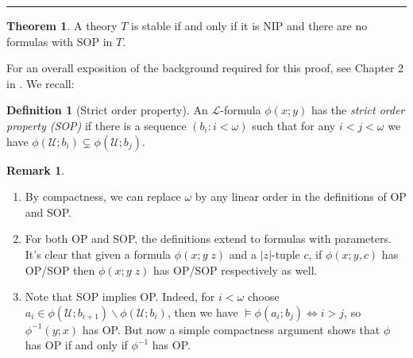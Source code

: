 \documentclass[a4paper]{report}
\newcommand{\ind}{\hspace{15pt}}
\newcommand{\tophat}{\hat{\phantom{.}}}
\renewcommand{\L}{\mathcal{L}}
\newcommand{\U}{\mathcal{U}}
\renewcommand{\iff}{\Leftrightarrow}
\theoremstyle{definition}
\newtheorem*{defn*}{Definition}
\newtheorem*{thm*}{Theorem}
\theoremstyle{remstyle}
\newtheorem*{rem*}{Remark}
\begin{document}
\par\noindent\rule{\textwidth}{0.4pt}

\begin{thm*}
	A theory $T$ is stable if and only if it is NIP and there are no formulas with SOP in $T$.
\end{thm*}

\ind For an overall exposition of the background required for this proof, see Chapter 2 in \cite{casanovas}. We recall:

\begin{defn*}[Strict order property]
	An $\L$-formula $\phi(x;y)$ has the \emph{strict order property (SOP)} if there is a sequence $(b_i:i<\omega)$ such that for any $i<j<\omega$ we have $\phi(\U;b_i)\subsetneq\phi(\U;b_j)$.
\end{defn*}

\begin{rem*}\
	\begin{enumerate}
		\item By compactness, we can replace $\omega$ by any linear order in the definitions of OP and SOP.
		\item For both OP and SOP, the definitions extend to formulas with parameters. It's clear that given a formula $\phi(x;y\tophat z)$ and a $|z|$-tuple $c$, if $\phi(x;y,c)$ has OP/SOP then $\phi(x;y\tophat z)$ has OP/SOP respectively as well.
		\item Note that SOP implies OP. Indeed, for $i<\omega$ choose $a_i\in\phi(\U;b_{i+1})\backslash\phi(\U;b_i)$, then we have $\models\phi(a_i;b_j)\iff i>j$, so $\phi^{-1}(y;x)$ has OP. But now a simple compactness argument shows that $\phi$ has OP if and only if $\phi^{-1}$ has OP.
	\end{enumerate}
\end{rem*}
\end{document}
